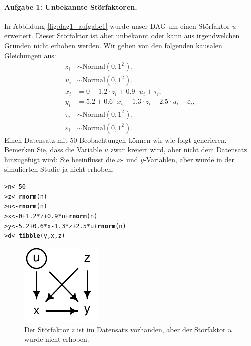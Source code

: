\documentclass[oneside, 10pt]{book}\usepackage[]{graphicx}\usepackage[]{xcolor}
\makeatletter
\newcommand{\hlnum}[1]{\textcolor[rgb]{0.686,0.059,0.569}{#1}}%
\newcommand{\hlopt}[1]{\textcolor[rgb]{0,0,0}{#1}}%
\newcommand{\hlstd}[1]{\textcolor[rgb]{0.345,0.345,0.345}{#1}}%
\newcommand{\hlkwb}[1]{\textcolor[rgb]{0.69,0.353,0.396}{#1}}%
\newcommand{\hlkwd}[1]{\textcolor[rgb]{0.737,0.353,0.396}{\textbf{#1}}}%
\newenvironment{kframe}{%
 \def\at@end@of@kframe{}%
 \ifinner\ifhmode%
  \def\at@end@of@kframe{\end{minipage}}%
  \begin{minipage}{\columnwidth}%
 \fi\fi%
 \def\FrameCommand##1{\hskip\@totalleftmargin \hskip-\fboxsep
 \colorbox{shadecolor}{##1}\hskip-\fboxsep
     \hskip-\linewidth \hskip-\@totalleftmargin \hskip\columnwidth}%
 \MakeFramed {\advance\hsize-\width
   \@totalleftmargin\z@ \linewidth\hsize
   \@setminipage}}%
 {\par\unskip\endMakeFramed%
 \at@end@of@kframe}
\newenvironment{knitrout}{}{} %
\makeatother
\begin{document}
\paragraph{Aufgabe 1: Unbekannte Störfaktoren.}
In Abbildung \ref{fig:dag1_aufgabe1} wurde unser DAG
um einen Störfaktor $u$ erweitert. Dieser Störfaktor
ist aber unbekannt oder kann aus irgendwelchen Gründen
nicht erhoben werden. Wir gehen von den folgenden kausalen
Gleichungen aus:
\begin{align*}
z_i &\sim \textrm{Normal}(0, 1^2),  \\
u_i &\sim \textrm{Normal}(0, 1^2), \\
x_i &= 0 + 1.2\cdot z_i + 0.9\cdot u_i + \tau_i, \\
y_i &= 5.2 + 0.6\cdot x_i - 1.3 \cdot z_i + 2.5\cdot u_i + \varepsilon_i,\\
\tau_i &\sim \textrm{Normal}(0, 1^2),  \\
\varepsilon_i &\sim \textrm{Normal}(0, 1^2).
\end{align*}
Einen Datensatz mit 50 Beobachtungen können wir wie folgt generieren.
Bemerken Sie, dass die Variable $u$ zwar kreiert wird, aber nicht dem Datensatz hinzugefügt wird:
Sie beeinflusst die $x$- und $y$-Variablen, aber wurde in der simulierten Studie ja nicht erhoben.
\begin{knitrout}
\color{fgcolor}\begin{kframe}
\begin{alltt}
\hlstd{> }\hlstd{n} \hlkwb{<-} \hlnum{50}
\hlstd{> }\hlstd{z} \hlkwb{<-} \hlkwd{rnorm}\hlstd{(n)}
\hlstd{> }\hlstd{u} \hlkwb{<-} \hlkwd{rnorm}\hlstd{(n)}
\hlstd{> }\hlstd{x} \hlkwb{<-} \hlnum{0} \hlopt{+} \hlnum{1.2}\hlopt{*}\hlstd{z} \hlopt{+} \hlnum{0.9}\hlopt{*}\hlstd{u} \hlopt{+} \hlkwd{rnorm}\hlstd{(n)}
\hlstd{> }\hlstd{y} \hlkwb{<-} \hlnum{5.2} \hlopt{+} \hlnum{0.6}\hlopt{*}\hlstd{x} \hlopt{-} \hlnum{1.3}\hlopt{*}\hlstd{z} \hlopt{+} \hlnum{2.5}\hlopt{*}\hlstd{u} \hlopt{+} \hlkwd{rnorm}\hlstd{(n)}
\hlstd{> }\hlstd{d} \hlkwb{<-} \hlkwd{tibble}\hlstd{(y, x, z)}
\end{alltt}
\end{kframe}
\end{knitrout}

\begin{knitrout}
\color{fgcolor}\begin{figure}[tp]

{\centering \includegraphics[width=.2\textwidth]{figs/unnamed-chunk-311-1} 

}

\caption{Der Störfaktor $z$ ist im Datensatz vorhanden, aber der Störfaktor $u$ wurde nicht erhoben.\label{fig:dag1_aufgabe1}}\label{fig:unnamed-chunk-311}
\end{figure}

\end{knitrout}
\end{document}
